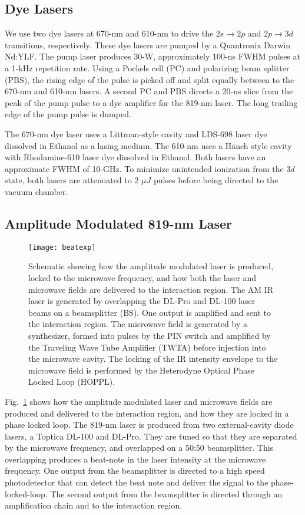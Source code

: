 \documentclass[aps,pra,preprint,groupedaddress]{revtex4-1}
\begin{document}
\subsection{\label{sec:dye} Dye Lasers}

We use two dye lasers at 670-nm and 610-nm to drive the $2s \rightarrow 2p$ and $2p \rightarrow 3d$ transitions, respectively. These dye lasers are pumped by a Quantronix Darwin Nd:YLF. The pump laser produces 30-W, approximately 100-ns FWHM pulses at a 1-kHz repetition rate. Using a Pockels cell (PC) and polarizing beam splitter (PBS), the rising edge of the pulse is picked off and split equally between to the 670-nm and 610-nm lasers. A second PC and PBS directs a 20-ns slice from the peak of the pump pulse to a dye amplifier for the 819-nm laser. The long trailing edge of the pump pulse is dumped.

The 670-nm dye laser uses a Littman-style cavity and LDS-698 laser dye dissolved in Ethanol as a lasing medium. The 610-nm uses a H{\"a}nch style cavity with Rhodamine-610 laser dye dissolved in Ethanol. Both lasers have an approximate FWHM of 10-GHz. To minimize unintended ionization from the $3d$ state, both lasers are attenuated to 2 $\mu J$ pulses before being directed to the vacuum chamber.

\subsection{\label{sec:ampmod} Amplitude Modulated 819-nm Laser}

\begin{figure}
	\texttt{[image: beatexp]}
	\caption{Schematic showing how the amplitude modulated laser is produced, locked to the microwave frequency, and how both the laser and microwave fields are delivered to the interaction region. The AM IR laser is generated by overlapping the DL-Pro and DL-100 laser beams on a beamsplitter (BS). One output is amplified and sent to the interaction region. The microwave field is generated by a synthesizer, formed into pulses by the PIN switch and amplified by the Traveling Wave Tube Amplifier (TWTA) before injection into the microwave cavity. The locking of the IR intensity envelope to the microwave field is performed by the Heterodyne Optical Phase Locked Loop (HOPPL).}
	\label{fig:pll}
\end{figure}

Fig.~\ref{fig:pll} shows how the amplitude modulated laser and microwave fields are produced and delivered to the interaction region, and how they are locked in a phase locked loop. The 819-nm laser is produced from two external-cavity diode lasers, a Toptica DL-100 and DL-Pro. They are tuned so that they are separated by the microwave frequency, and overlapped on a 50:50 beamsplitter. This overlapping produces a beat-note in the laser intensity at the microwave frequency. One output from the beamsplitter is directed to a high speed photodetector that can detect the beat note and deliver the signal to the phase-locked-loop. The second output from the beamsplitter is directed through an amplification chain and to the interaction region.
\end{document}
